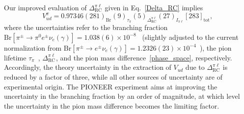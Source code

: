 \documentclass[prl,twocolumn,twoside,preprintnumbers,superscriptaddress,nofootinbib,letterpaper]{revtex4-1}
\newcommand{\beq}{\begin{equation}}
\newcommand{\eeq}{\end{equation}}
\begin{document}
Our improved evaluation of $\Delta_\text{RC}^{\pi\ell}$ given in Eq.~\eqref{Delta_RC} implies
\beq
\label{Vud_final}
V_{ud}^\pi=0.97346(281)_\text{Br}(9)_{\tau_\pi}(5)_{\Delta_\text{RC}^{\pi\ell}}(27)_{I_{\pi\ell}}[283]_\text{tot},
\eeq
where the uncertainties refer to the branching fraction $\text{Br}[\pi^\pm\to\pi^0e^\pm\nu_e(\gamma)]=1.038(6)\times 10^{-8}$~\cite{Pocanic:2003pf} (slightly adjusted to the current normalization from $\text{Br}[\pi^\pm\to e^\pm\nu_e(\gamma)]=1.2326(23)\times 10^{-4}$~\cite{ParticleDataGroup:2026,PiENu:2015seu,Czapek:1993kc,Britton:1992pg}), the pion lifetime $\tau_\pi$~\cite{ParticleDataGroup:2026,Koptev:1995je,Numao:1995qf}, $\Delta_\text{RC}^{\pi\ell}$, and the pion mass difference~\eqref{phase_space}, respectively. Accordingly, the theory uncertainty in the extraction of $V_{ud}$ due to $\Delta_\text{RC}^{\pi\ell}$ is reduced by a factor of three, while all other sources of uncertainty are of experimental origin. The PIONEER experiment aims at improving the uncertainty in the branching fraction by an order of magnitude, at which level the uncertainty in the pion mass difference becomes the limiting factor.
\end{document}
